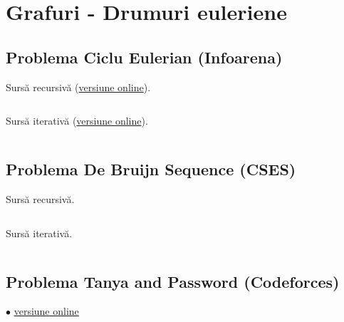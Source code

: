 \documentclass[../main.tex]{subfiles}
\begin{document}
\chapter{Grafuri - Drumuri euleriene}

\section{Problema Ciclu Eulerian (Infoarena)}
\label{code:ciclu-eulerian}

Sursă recursivă (\href{https://www.infoarena.ro/job_detail/3346336?action=view-source}{versiune online}).

\inputminted{cpp}{../src/graphs/ciclu-eulerian-rec.cpp}

Sursă iterativă (\href{https://www.infoarena.ro/job_detail/3346340?action=view-source}{versiune online}).

\inputminted{cpp}{../src/graphs/ciclu-eulerian-iter.cpp}

\section{Problema De Bruijn Sequence (CSES)}
\label{code:de-bruijn-sequence}

Sursă recursivă.

\inputminted{cpp}{../src/graphs/de-bruijn-sequence-rec.cpp}

Sursă iterativă.

\inputminted{cpp}{../src/graphs/de-bruijn-sequence-iter.cpp}

\section{Problema Tanya and Password (Codeforces)}
\label{code:tanya-and-password}
$\bullet$
\href{https://codeforces.com/contest/508/submission/246912300}{versiune online}

\inputminted{cpp}{../src/graphs/tanya-and-password.cpp}
\end{document}
